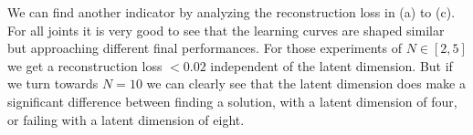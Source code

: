 We can find another indicator by analyzing the reconstruction loss in  (a) to (c). For all joints it is very good to see that the learning curves are shaped similar but approaching different final performances. For those experiments of $N \in [2, 5]$ we get a reconstruction loss $< 0.02$ independent of the latent dimension. But if we turn towards $N = 10$ we can clearly see that the latent dimension does make a significant difference between finding a solution, with a latent dimension of four, or failing with a latent dimension of eight.
\begin{figure}
    \begin{center}
        \hfill
        \hfill

\end{center}
\end{figure}
